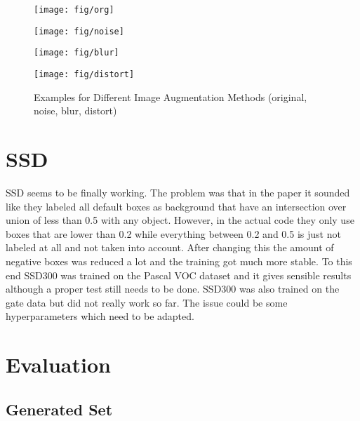 \documentclass{article}
\begin{document}
\begin{figure}[h]
	\centering
	
	\begin{minipage}{0.24\textwidth}
		\centering
		\texttt{[image: fig/org]}
	\end{minipage}
	\begin{minipage}{0.24\textwidth}
		\centering
		\texttt{[image: fig/noise]}
	\end{minipage}
	\begin{minipage}{0.24\textwidth}
		\centering
		\texttt{[image: fig/blur]}
	\end{minipage}
	\begin{minipage}{0.24\textwidth}
		\centering
		\texttt{[image: fig/distort]}
	\end{minipage}
	\caption{Examples for Different Image Augmentation Methods (original, noise, blur, distort)}
	\label{fig:aug}
\end{figure}

\section{SSD}

SSD seems to be finally working. The problem was that in the paper it sounded like they labeled all default boxes as background that have an intersection over union of less than 0.5 with any object. However, in the actual code they only use boxes that are lower than 0.2 while everything between 0.2 and 0.5 is just not labeled at all and not taken into account. After changing this the amount of negative boxes was reduced a lot and the training got much more stable. To this end SSD300 was trained on the Pascal VOC dataset and it gives sensible results although a proper test still needs to be done. SSD300 was also trained on the gate data but did not really work so far. The issue could be some hyperparameters which need to be adapted.

\section{Evaluation}

\subsection{Generated Set}
\end{document}
